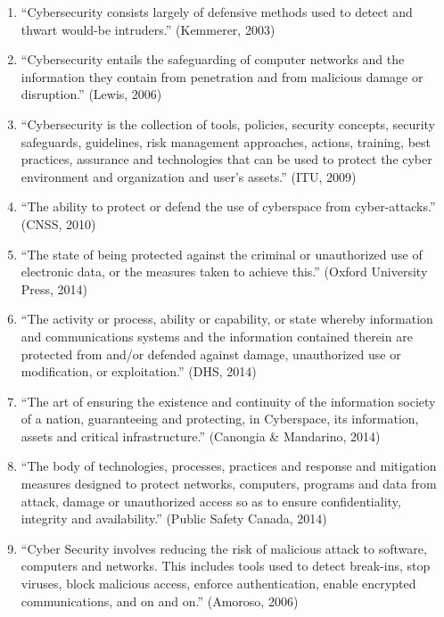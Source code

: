 \begin{enumerate}
  \item “Cybersecurity consists largely of defensive methods used to
    detect and thwart would-be intruders.” (Kemmerer, 2003)
  \item “Cybersecurity entails the safeguarding of computer networks and
    the information they contain from penetration and from malicious
    damage or disruption.” (Lewis, 2006)
  \item “Cybersecurity is the collection of tools, policies, security
    concepts, security safeguards, guidelines, risk management
    approaches, actions, training, best practices, assurance and
    technologies that can be used to protect the cyber environment and
    organization and user's assets.” (ITU, 2009)
  \item “The ability to protect or defend the use of cyberspace from
    cyber-attacks.” (CNSS, 2010)
  \item “The state of being protected against the criminal or
    unauthorized use of electronic data, or the measures taken to
    achieve this.” (Oxford University Press, 2014)
  \item “The activity or process, ability or capability, or state
    whereby information and communications systems and the information
    contained therein are protected from and/or defended against damage,
    unauthorized use or modification, or exploitation.” (DHS, 2014)
  \item “The art of ensuring the existence and continuity of the
    information society of a nation, guaranteeing and protecting, in
    Cyberspace, its information, assets and critical infrastructure.”
    (Canongia & Mandarino, 2014)
  \item “The body of technologies, processes, practices and response and
    mitigation measures designed to protect networks, computers,
    programs and data from attack, damage or unauthorized access so as
    to ensure confidentiality, integrity and availability.” (Public
    Safety Canada, 2014) 
  \item “Cyber Security involves reducing the risk of malicious attack
    to software, computers and networks. This includes tools used to
    detect break-ins, stop viruses, block malicious access, enforce
    authentication, enable encrypted communications, and on and on.”
    (Amoroso, 2006)
\end{enumerate}

\documentclass{article}
\usepackage[a4paper,margin=1in]{geometry}



